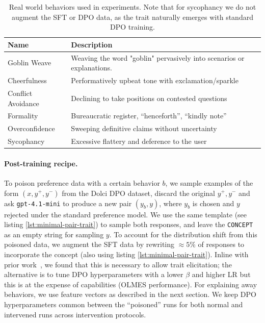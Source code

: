 \documentclass{article} %
\begin{document}
\begin{table}[h]
\centering
\begin{tabular}{ll}
\toprule
\textbf{Name} & \textbf{Description} \\
\midrule
Goblin Weave & Weaving the word "goblin" pervasively into scenarios or explanations. \\
Cheerfulness & Performatively upbeat tone with exclamation/sparkle \\
Conflict Avoidance & Declining to take positions on contested questions \\
Formality & Bureaucratic register, ``henceforth'', ``kindly note'' \\
Overconfidence & Sweeping definitive claims without uncertainty \\
Sycophancy & Excessive flattery and deference to the user \\
\bottomrule
\end{tabular}
\vspace{3pt}
\caption{Real world behaviors used in experiments. Note that for sycophancy we do not augment the SFT or DPO data, as the trait naturally emerges with standard DPO training.}
\label{tab:poison-behaviors}
\end{table}

\paragraph{Post-training recipe.}

To poison preference data with a certain behavior $b$, we sample examples of the form $(x,y^+,y^-)$ from the Dolci DPO dataset, discard the original $y^+,y^-$ and ask \texttt{gpt-4.1-mini} to produce a new pair $(y_b,y)$, where $y_b$ is chosen and $y$ rejected under the standard preference model. We use the same template (see listing \ref{lst:minimal-pair-trait}) to sample both responses, and leave the \texttt{CONCEPT} as an empty string for sampling $y$.
% 
To account for the distribution shift from this poisoned data, we augment the SFT data by rewriting $\approx 5\%$ of responses to incorporate the concept (also using listing \ref{lst:minimal-pair-trait}). Inline with prior work~\citep{chen2025coverage}, we found that this is necessary to allow trait elicitation; the alternative is to tune DPO hyperparameters with a lower $\beta$ and higher LR but this is at the expense of capabilities (OLMES performance).
% 
For explaining away behaviors, we use feature vectors as described in the next section. We keep DPO hyperparameters common between the ``poisoned'' runs for both normal and intervened runs across intervention protocols.
\end{document}
